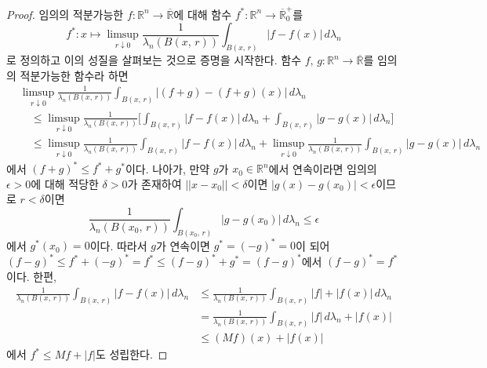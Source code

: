 \begin{proof}
    임의의 적분가능한 $f:\mathbb{R}^n\to\overline{\mathbb{R}}$에 대해 함수 $f^*:\mathbb{R}^n\to\overline{\mathbb{R}}^+_0$를
    \begin{equation*}
        f^*:x\mapsto\limsup_{r\downarrow0}\frac{1}{\lambda_n(B(x,\,r))}\int_{B(x,\,r)}|f-f(x)|\,d\lambda_n
    \end{equation*}
    로 정의하고 이의 성질을 살펴보는 것으로 증명을 시작한다. 함수 $f,\,g:\mathbb{R}^n\to\overline{\mathbb{R}}$를 임의의 적분가능한 함수라 하면
    \begin{align*}
        &\limsup_{r\downarrow0}\frac{1}{\lambda_n(B(x,\,r))}\int_{B(x,\,r)}|(f+g)-(f+g)(x)|\,d\lambda_n\\
        &\quad\leq\limsup_{r\downarrow0}\frac{1}{\lambda_n(B(x,\,r))}\bigg[\int_{B(x,\,r)}|f-f(x)|\,d\lambda_n+\int_{B(x,\,r)}|g-g(x)|\,d\lambda_n\bigg]\\
        &\quad\leq\limsup_{r\downarrow0}\frac{1}{\lambda_n(B(x,\,r))}\int_{B(x,\,r)}|f-f(x)|\,d\lambda_n+\limsup_{r\downarrow0}\frac{1}{\lambda_n(B(x,\,r))}\int_{B(x,\,r)}|g-g(x)|\,d\lambda_n
    \end{align*}
    에서 $(f+g)^*\leq f^*+g^*$이다. 나아가, 만약 $g$가 $x_0\in\mathbb{R}^n$에서 연속이라면 임의의 $\epsilon>0$에 대해 적당한 $\delta>0$가 존재하여 $||x-x_0||<\delta$이면 $|g(x)-g(x_0)|<\epsilon$이므로 $r<\delta$이면
    \begin{equation*}
        \frac{1}{\lambda_n(B(x_0,\,r))}\int_{B(x_0,\,r)}|g-g(x_0)|\,d\lambda_n\leq\epsilon
    \end{equation*}
    에서 $g^*(x_0)=0$이다. 따라서 $g$가 연속이면 $g^*=(-g)^*=0$이 되어 $(f-g)^*\leq f^*+(-g)^*=f^*\leq(f-g)^*+g^*=(f-g)^*$에서 $(f-g)^*=f^*$이다. 한편,
    \begin{align*}
        \frac{1}{\lambda_n(B(x,\,r))}\int_{B(x,\,r)}|f-f(x)|\,d\lambda_n&\leq\frac{1}{\lambda_n(B(x,\,r))}\int_{B(x,\,r)}|f|+|f(x)|\,d\lambda_n\\
        &=\frac{1}{\lambda_n(B(x,\,r))}\int_{B(x,\,r)}|f|\,d\lambda_n+|f(x)|\\
        &\leq (Mf)(x)+|f(x)|
    \end{align*}
    에서 $f^*\leq Mf+|f|$도 성립한다.
    

\end{proof}
